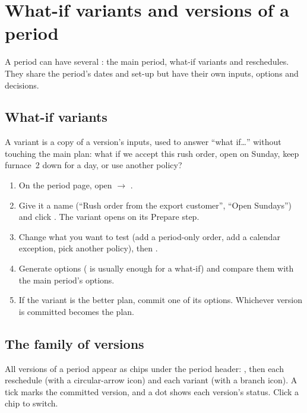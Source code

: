 \chapter{What-if variants and versions of a period}\label{ch:variants}

A period can have several : the main period, what-if variants and reschedules. They share the
period's dates and set-up but have their own inputs, options and decisions.

\section{What-if variants}

A variant is a copy of a version's inputs, used to answer ``what if\dots'' without touching the main plan:
what if we accept this rush order, open on Sunday, keep furnace~2 down for a day, or use another policy?

\begin{steps}
\begin{enumerate}
  \item On the period page, open  $\rightarrow$ .
  \item Give it a name (``Rush order from the export customer'', ``Open Sundays'') and click . The variant opens on its Prepare step.
  \item Change what you want to test (add a period-only order, add a calendar exception, pick another policy),
        then .
  \item Generate options ( is usually enough for a what-if) and compare them with the main period's
        options.
  \item If the variant is the better plan, commit one of its options. Whichever version is committed becomes
        the plan.
\end{enumerate}
\end{steps}


\section{The family of versions}\label{sec:family}

All versions of a period appear as chips under the period header: , then each reschedule (with a
circular-arrow icon) and each variant (with a branch icon). A tick marks the committed version, and a dot shows
each version's status. Click a chip to switch.

